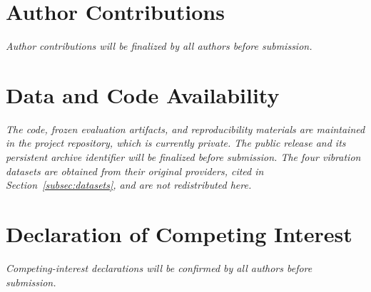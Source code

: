 \documentclass[11pt]{article}
\begin{document}






\section*{Author Contributions}
\textit{Author contributions will be finalized by all authors before submission.}

\section*{Data and Code Availability}
\textit{The code, frozen evaluation artifacts, and reproducibility materials are
maintained in the project repository, which is currently private. The public release
and its persistent archive identifier will be finalized before submission. The four
vibration datasets are obtained from their original providers, cited in
Section~\ref{subsec:datasets}, and are not redistributed here.}

\section*{Declaration of Competing Interest}
\textit{Competing-interest declarations will be confirmed by all authors before
submission.}




\end{document}
